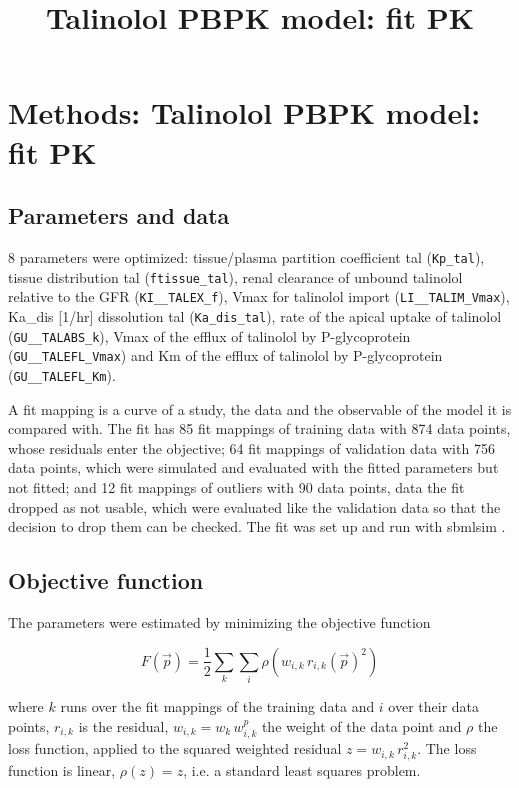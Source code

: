 \documentclass{article}
\title{Talinolol PBPK model: fit PK}
\date{}
\begin{document}
\maketitle

\section{Methods: Talinolol PBPK model: fit PK}

\subsection{Parameters and data}

8 parameters were optimized: tissue/plasma partition coefficient tal (\texttt{Kp\_tal}), tissue distribution tal (\texttt{ftissue\_tal}), renal clearance of unbound talinolol relative to the GFR (\texttt{KI\_\_TALEX\_f}), Vmax for talinolol import (\texttt{LI\_\_TALIM\_Vmax}), Ka\_dis [1/hr] dissolution tal (\texttt{Ka\_dis\_tal}), rate of the apical uptake of talinolol (\texttt{GU\_\_TALABS\_k}), Vmax of the efflux of talinolol by P-glycoprotein (\texttt{GU\_\_TALEFL\_Vmax}) and Km of the efflux of talinolol by P-glycoprotein (\texttt{GU\_\_TALEFL\_Km}).

A fit mapping is a curve of a study, the data and the observable of the model it is compared with. The fit has 85 fit mappings of training data with 874 data points, whose residuals enter the objective; 64 fit mappings of validation data with 756 data points, which were simulated and evaluated with the fitted parameters but not fitted; and 12 fit mappings of outliers with 90 data points, data the fit dropped as not usable, which were evaluated like the validation data so that the decision to drop them can be checked. The fit was set up and run with sbmlsim \cite{Koenig2026_sbmlsim}.

\subsection{Objective function}

The parameters were estimated by minimizing the objective function

\begin{equation}
F(\vec{p}) = \frac{1}{2} \sum_{k} \sum_{i} \rho\left(w_{i,k}\, r_{i,k}(\vec{p})^2\right)
\end{equation}

where $k$ runs over the fit mappings of the training data and $i$ over their data points, $r_{i,k}$ is the residual, $w_{i,k} = w_k\, w^{p}_{i,k}$ the weight of the data point and $\rho$ the loss function, applied to the squared weighted residual $z = w_{i,k}\, r_{i,k}^2$. The loss function is linear, $\rho(z) = z$, i.e. a standard least squares problem.
\end{document}
